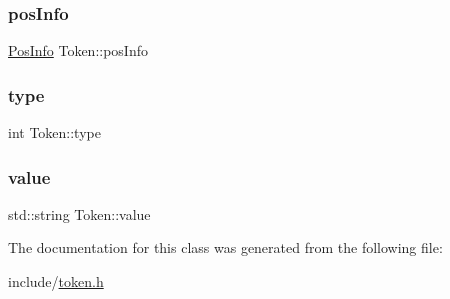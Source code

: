 \mbox{\label{classToken_a1eea7460906ca57268f808f011af34e6}} 
\subsubsection{\texorpdfstring{pos\+Info}{posInfo}}
{\footnotesize\ttfamily \hyperlink{classPosInfo}{Pos\+Info} Token\+::pos\+Info}

\mbox{\label{classToken_ae46b6b806df89709a13a14dc76c86623}} 
\subsubsection{\texorpdfstring{type}{type}}
{\footnotesize\ttfamily int Token\+::type}

\mbox{\label{classToken_a4b7142147b8598f8e24c404928d9263b}} 
\subsubsection{\texorpdfstring{value}{value}}
{\footnotesize\ttfamily std\+::string Token\+::value}



The documentation for this class was generated from the following file\+:\begin{DoxyCompactItemize}
\item 
include/\hyperlink{token_8h}{token.\+h}\end{DoxyCompactItemize}
